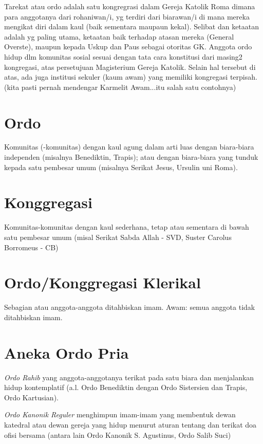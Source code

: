 
Tarekat atau ordo adalah satu kongregrasi dalam Gereja Katolik Roma dimana para anggotanya dari rohaniwan/i, yg terdiri dari biarawan/i di mana mereka mengikat diri dalam kaul (baik sementara maupaun kekal). Selibat dan ketaatan adalah yg paling utama, ketaatan baik terhadap atasan mereka (General Overste), maupun kepada Uskup dan Paus sebagai otoritas GK. Anggota ordo hidup dlm komunitas sosial sesuai dengan tata cara konstitusi dari masing2 kongregasi, atas persetujuan Magisterium Gereja Katolik.
Selain hal tersebut di atas, ada juga institusi sekuler (kaum awam) yang memiliki kongregasi terpisah. (kita pasti pernah mendengar Karmelit Awam...itu salah satu contohnya)

\section*{Ordo}
Komunitas (-komunitas) dengan kaul agung dalam arti luas dengan biara-biara independen (misalnya Benediktin, Trapis); atau dengan biara-biara yang tunduk kepada satu pembesar umum (misalnya Serikat Jesus, Ursulin uni Roma).

\section*{Konggregasi}
Komunitas-komunitas dengan kaul sederhana, tetap atau sementara di bawah satu pembesar umum (misal Serikat Sabda Allah - SVD, Suster Carolus Borromeus - CB)

\section*{Ordo/Konggregasi Klerikal}
Sebagian atau anggota-anggota ditahbiskan imam.
Awam: semua anggota tidak ditahbiskan imam.

\section*{Aneka Ordo Pria}
\textit{Ordo Rahib} yang anggota-anggotanya terikat pada satu biara dan menjalankan hidup kontemplatif (a.l. Ordo Benediktin dengan Ordo Sistersien dan Trapis, Ordo Kartusian).

\textit{Ordo Kanonik Reguler} menghimpun imam-imam yang membentuk dewan katedral atau dewan gereja yang hidup menurut aturan tentang dan terikat doa ofisi bersama (antara lain Ordo Kanonik S. Agustinus, Ordo Salib Suci)

